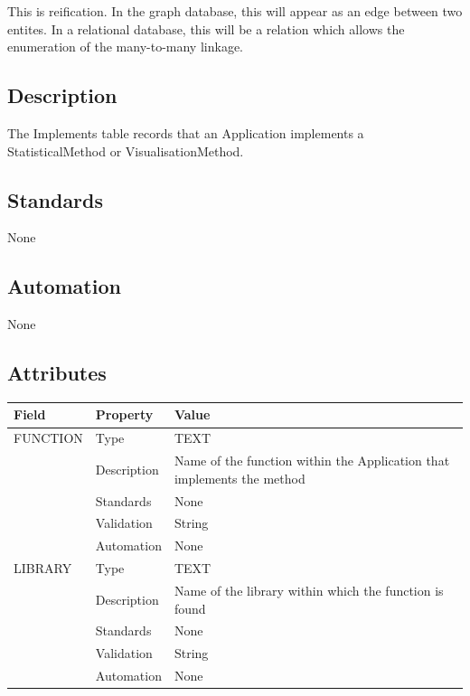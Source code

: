 This is reification. In the graph database, this will appear as an edge
between two entites. In a relational database, this will be a relation
which allows the enumeration of the many-to-many linkage.

\subsection{Description}\label{description-14}

The Implements table records that an Application implements a
StatisticalMethod or VisualisationMethod.

\subsection{Standards}\label{standards-16}

None

\subsection{Automation}\label{automation-16}

None

\subsection{Attributes}\label{attributes-14}

\begin{longtable}[]{@{}
  >{\raggedright\arraybackslash}p{}
  >{\raggedright\arraybackslash}p{}
  >{\raggedright\arraybackslash}p{}@{}}
\toprule\noalign{}
\begin{minipage}[b]{\linewidth}\raggedright
Field
\end{minipage} & \begin{minipage}[b]{\linewidth}\raggedright
Property
\end{minipage} & \begin{minipage}[b]{\linewidth}\raggedright
Value
\end{minipage} \\
\midrule\noalign{}
\endhead
\bottomrule\noalign{}
\endlastfoot
FUNCTION & Type & TEXT \\
& Description & Name of the function within the Application that
implements the method \\
& Standards & None \\
& Validation & String \\
& Automation & None \\
LIBRARY & Type & TEXT \\
& Description & Name of the library within which the function is
found \\
& Standards & None \\
& Validation & String \\
& Automation & None \\
\end{longtable}

